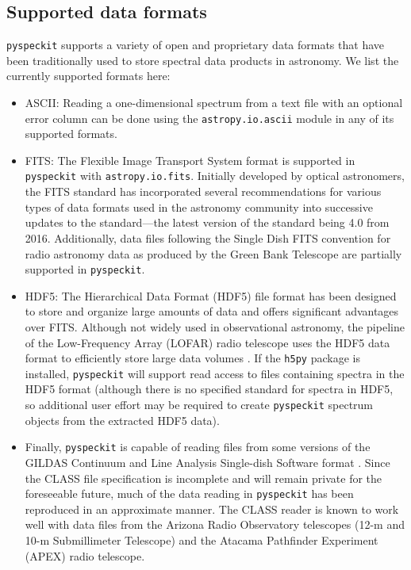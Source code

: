 \documentclass[twocolumn]{aastex62}
\newcommand{\pyspeckit}{\texttt{pyspeckit}\xspace}
\begin{document}
\subsection{Supported data formats}

\pyspeckit supports a variety of open and proprietary data formats that have
been traditionally used to store spectral data products in astronomy. 
We list the currently supported formats here:

\begin{itemize}
    \item ASCII: Reading a one-dimensional spectrum from a text file with an optional
        error column can
be done using the \texttt{astropy.io.ascii} module in any of its supported
formats.  
    \item FITS: The Flexible Image Transport System \citep[FITS;][]{Pence2010a} format is
supported in \pyspeckit with \texttt{astropy.io.fits}.  Initially developed
by optical astronomers, the FITS standard has incorporated several
recommendations for various types of data formats used in the astronomy
community into successive updates to the standard---the latest version of the
standard being 4.0 from 2016.  Additionally, data files following the Single
Dish FITS \citep[SDFITS;][]{Garwood2000a} convention for radio astronomy data as
produced by the Green Bank Telescope are partially supported in \pyspeckit.
    \item HDF5: The Hierarchical Data Format (HDF5) file format has been
        designed to store and organize large amounts of data and offers
        significant advantages over FITS\@.  Although not widely used in
        observational astronomy, the pipeline of the Low-Frequency Array
        (LOFAR) radio telescope uses the HDF5 data format to efficiently store
        large data volumes \citep{Alexov2012a}.  If the \texttt{h5py} package
        is installed, \pyspeckit will support read access to files containing
        spectra in the HDF5 format (although there is no specified standard for
        spectra in HDF5, so additional user effort may be required to create
        \pyspeckit spectrum objects from the extracted HDF5 data).
    \item Finally, \pyspeckit is capable of reading files from some versions of
        the GILDAS Continuum and Line Analysis Single-dish Software format
        \citep[CLASS;][]{Gildas-Team2013a}.  Since the CLASS file specification
        is incomplete and will remain private for the foreseeable future, much
        of the data reading in \pyspeckit has been reproduced in an approximate
        manner.  
        The CLASS reader is known to work well with data files from
        the Arizona Radio Observatory telescopes (12-m and 10-m Submillimeter
        Telescope) and the Atacama Pathfinder Experiment (APEX) radio
        telescope. 
\end{itemize}
\end{document}
